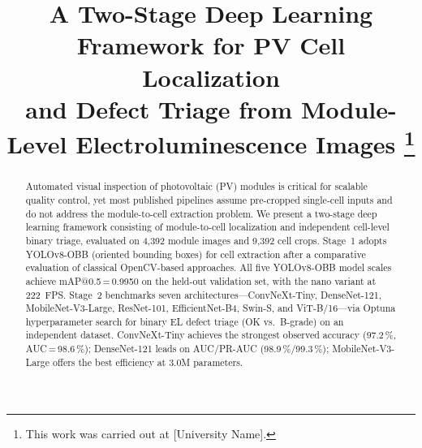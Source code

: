 \documentclass[conference]{IEEEtran}
\begin{document}
\title{A Two-Stage Deep Learning Framework for PV Cell Localization\\
and Defect Triage from Module-Level Electroluminescence Images%
\thanks{This work was carried out at [University Name].}}

\author{%
\and
{}
}

\maketitle

\begin{abstract}
Automated visual inspection of photovoltaic (PV) modules is critical for scalable quality control, yet most published pipelines assume pre-cropped single-cell inputs and do not address the module-to-cell extraction problem. We present a two-stage deep learning framework consisting of module-to-cell localization and independent cell-level binary triage, evaluated on 4{,}392 module images and 9{,}392 cell crops. Stage~1 adopts YOLOv8-OBB (oriented bounding boxes) for cell extraction after a comparative evaluation of classical OpenCV-based approaches. All five YOLOv8-OBB model scales achieve mAP@0.5\,=\,0.9950 on the held-out validation set, with the nano variant at 222~FPS. Stage~2 benchmarks seven architectures---ConvNeXt-Tiny, DenseNet-121, MobileNet-V3-Large, ResNet-101, EfficientNet-B4, Swin-S, and ViT-B/16---via Optuna hyperparameter search for binary EL defect triage (OK vs.\ B-grade) on an independent dataset. ConvNeXt-Tiny achieves the strongest observed accuracy (97.2\,\%, AUC\,=\,98.6\,\%); DenseNet-121 leads on AUC/PR-AUC (98.9\,\%/99.3\,\%); MobileNet-V3-Large offers the best efficiency at 3.0M parameters.
\end{abstract}
\end{document}
